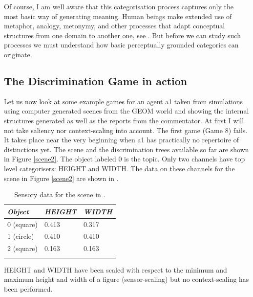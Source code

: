 Of course, I am well aware that this categorisation 
process captures only the most basic way of generating
meaning. Human beings make extended use of metaphor, 
analogy, metonymy, and other processes that adapt 
conceptual structures from one domain to another one, see \cite{Johnson:1987}.
But before we can study such processes we must understand
how basic perceptually grounded categories can 
originate. 
 
\subsection{The Discrimination Game in action}

Let us now look at some example 
games for an agent {\bfshape a1} taken from simulations
using computer generated
scenes from the GEOM world and showing the internal
structures generated as well as the reports from the commentator. 
At first I will not take saliency nor 
context-scaling into account. The first game
(Game 8) fails. It takes place near the very beginning 
when {\bfshape a1} has practically 
no repertoire of distinctions yet. The scene and the 
discrimination trees available so far are shown in Figure 
\ref{scene2}. The object labeled 0 is the
topic. Only two channels have top level
categorisers: HEIGHT and WIDTH. 
The data on these channels for the scene in Figure
\ref{scene2} are shown in . 

\begin{table}
\begin{center}
\begin{tabular}{ l  l  l }
\lsptoprule
{\itshape Object} & {\itshape HEIGHT} & {\itshape WIDTH} \\ \midrule
0 (square) & 0.413 & 0.317  \\ 
1 (circle) & 0.410 & 0.410 \\ 
2 (square) & 0.163 & 0.163 \\ 
\lspbottomrule
\end{tabular}
\caption{\label{tab:t-game8}Sensory data for the scene in .}
\end{center}
\end{table}

HEIGHT and WIDTH have been scaled with respect to the 
minimum and maximum height and width of a 
figure (sensor-scaling) but no context-scaling has 
been performed. 

